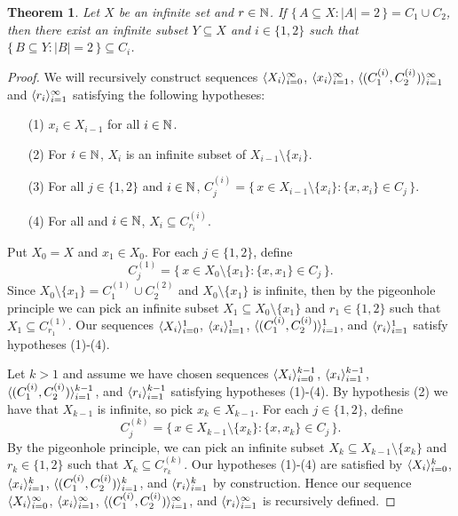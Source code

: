 \documentclass[12pt]{article}
\theoremstyle{plain}
\newtheorem{thm}{Theorem}[section]
\begin{document}
\begin{thm}
  \label{thm:ramsey2Col}
  Let $X$ be an infinite set and $r \in \mathbb{N}$.
  If $\{\, A \subseteq X : |A| = 2 \,\} = C_1 \cup C_2$, then there
  exist an infinite subset $Y \subseteq X$ and $i \in \{1, 2\}$ such
  that $\{\, B \subseteq Y : |B| = 2 \,\} \subseteq C_i$.
\end{thm}
\begin{proof}
  We will recursively construct sequences $\langle X_i \rangle_{i=0}^\infty$,
  $\langle x_i \rangle_{i=1}^\infty$, $\langle (C_1^{(i)}, C_2^{(i)})
  \rangle_{i=1}^\infty$ and $\langle r_i \rangle_{i=1}^\infty$ satisfying the
  following hypotheses:
  \begin{itemize}
    \item[(1)] $x_i \in X_{i-1}$ for all $i \in \mathbb{N}$.
      
    \item[(2)] For $i \in \mathbb{N}$, $X_i$ is an infinite subset of
      $X_{i-1} \setminus \{x_i\}$.

    \item[(3)] For all $j \in \{1, 2\}$ and $i \in \mathbb{N}$, $C_j^{(i)} =
      \bigl\{\, x \in X_{i-1} \setminus \{x_i\} : \{x, x_i\} \in C_j
      \,\bigr\}$.

    \item[(4)] For all and $i \in \mathbb{N}$, $X_i
      \subseteq C_{r_i}^{(i)}$.
  \end{itemize}
  
  Put $X_0 = X$ and $x_1 \in X_0$.
  For each $j \in \{1,2\}$, define
  \[
    C_j^{(1)} = \bigl\{\, x \in X_0 \setminus \{x_1\} : \{x, x_1\} \in
    C_j \,\bigr\}.
  \]
  Since $X_0 \setminus \{x_1\} = C_1^{(1)} \cup C_2^{(2)}$ and $X_0
  \setminus \{x_1\}$ is infinite, then by the pigeonhole principle we
  can pick an infinite subset $X_1 \subseteq X_0 \setminus \{x_1\}$
  and $r_1 \in \{1, 2\}$ such that $X_1 \subseteq C_{r_1}^{(1)}$.
  Our sequences $\langle X_i \rangle_{i=0}^1$, $\langle x_i \rangle_{i=1}^1$, $\langle
  (C_1^{(i)}, C_2^{(i)}) \rangle_{i=1}^1$, and $\langle r_i \rangle_{i=1}^1$
  satisfy hypotheses (1)-(4).

  Let $k > 1$ and assume we have chosen sequences $\langle X_i
  \rangle_{i=0}^{k-1}$, $\langle x_i \rangle_{i=1}^{k-1}$, $\langle (C_1^{(i)}, C_2^{(i)})
  \rangle_{i=1}^{k-1}$, and $\langle r_i \rangle_{i=1}^{k-1}$ satisfying
  hypotheses (1)-(4).
  By hypothesis (2) we have that $X_{k-1}$ is infinite, so pick $x_k
  \in X_{k-1}$.
  For each $j \in \{1, 2\}$, define
  \[
    C_j^{(k)} = \bigl\{\, x \in X_{k-1} \setminus \{x_k\} : \{x, x_k\} \in
    C_j \,\bigr\}.
  \]
  By the pigeonhole principle, we can pick an infinite subset $X_k
  \subseteq X_{k-1} \setminus \{x_k\}$ and $r_k \in \{1, 2\}$ such
  that $X_k \subseteq C_{r_k}^{(k)}$.
  Our hypotheses (1)-(4) are satisfied by $\langle X_i
  \rangle_{i=0}^{k}$, $\langle x_i \rangle_{i=1}^{k}$, $\langle (C_1^{(i)}, C_2^{(i)})
  \rangle_{i=1}^{k}$, and $\langle r_i \rangle_{i=1}^{k}$ by construction. 
  Hence our sequence $\langle X_i \rangle_{i=0}^{\infty}$, $\langle x_i
  \rangle_{i=1}^{\infty}$, $\langle (C_1^{(i)}, C_2^{(i)}) \rangle_{i=1}^{\infty}$, and
  $\langle r_i \rangle_{i=1}^{\infty}$ is recursively defined.


\end{proof}
\end{document}
